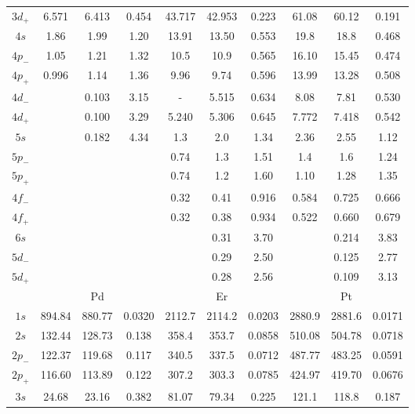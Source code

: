 \begin{longtable}{|c|ccc|ccc|ccc|}
$3d_+$ & 6.571  & 6.413  & 0.454  & 43.717 & 42.953 & 0.223  & 61.08  & 60.12  & 0.191 \\
$4s$   & 1.86   & 1.99   & 1.20   & 13.91  & 13.50  & 0.553  & 19.8   & 18.8   & 0.468 \\
$4p_-$ & 1.05   & 1.21   & 1.32   & 10.5   & 10.9   & 0.565  & 16.10  & 15.45  & 0.474 \\
$4p_+$ & 0.996  & 1.14   & 1.36   & 9.96   & 9.74   & 0.596  & 13.99  & 13.28  & 0.508 \\
$4d_-$ &        & 0.103  & 3.15   & -      & 5.515  & 0.634  & 8.08   & 7.81   & 0.530 \\
$4d_+$ &        & 0.100  & 3.29   & 5.240  & 5.306  & 0.645  & 7.772  & 7.418  & 0.542 \\
$5s$   &        & 0.182  & 4.34   & 1.3    & 2.0    & 1.34   & 2.36   & 2.55   & 1.12 \\
$5p_-$ &        &        &        & 0.74   & 1.3    & 1.51   & 1.4    & 1.6    & 1.24 \\
$5p_+$ &        &        &        & 0.74   & 1.2    & 1.60   & 1.10   & 1.28   & 1.35 \\
$4f_-$ &        &        &        & 0.32   & 0.41   & 0.916  & 0.584  & 0.725  & 0.666 \\
$4f_+$ &        &        &        & 0.32   & 0.38   & 0.934  & 0.522  & 0.660  & 0.679 \\
$6s$   &        &        &        &        & 0.31   & 3.70   &        & 0.214 & 3.83 \\
$5d_-$ &        &        &        &        & 0.29   & 2.50   &        & 0.125 & 2.77 \\
$5d_+$ &        &        &        &        & 0.28   & 2.56   &        & 0.109 & 3.13 \\
\hline
  & \multicolumn{3}{c}{Pd} &  \multicolumn{3}{c}{Er} & \multicolumn{3}{c}{Pt} \\
\hline
$1s$   & 894.84 & 880.77 & 0.0320 & 2112.7 & 2114.2 & 0.0203 & 2880.9 & 2881.6 & 0.0171 \\
$2s$   & 132.44 & 128.73 & 0.138  & 358.4  & 353.7  & 0.0858 & 510.08 & 504.78 & 0.0718 \\
$2p_-$ & 122.37 & 119.68 & 0.117  & 340.5  & 337.5  & 0.0712 & 487.77 & 483.25 & 0.0591 \\
$2p_+$ & 116.60 & 113.89 & 0.122  & 307.2  & 303.3  & 0.0785 & 424.97 & 419.70 & 0.0676 \\
$3s$   & 24.68  & 23.16  & 0.382  & 81.07  & 79.34  & 0.225  & 121.1  & 118.8  & 0.187 \\

\end{longtable}
